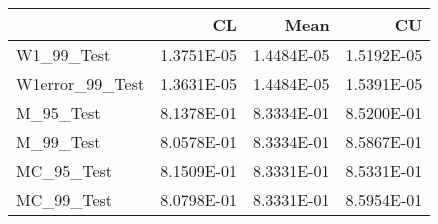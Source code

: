 \begin{tabular}{lrrr}
\toprule
{} &         CL &       Mean &         CU \\
\midrule
W1\_99\_Test      & 1.3751E-05 & 1.4484E-05 & 1.5192E-05 \\
W1error\_99\_Test & 1.3631E-05 & 1.4484E-05 & 1.5391E-05 \\
M\_95\_Test       & 8.1378E-01 & 8.3334E-01 & 8.5200E-01 \\
M\_99\_Test       & 8.0578E-01 & 8.3334E-01 & 8.5867E-01 \\
MC\_95\_Test      & 8.1509E-01 & 8.3331E-01 & 8.5331E-01 \\
MC\_99\_Test      & 8.0798E-01 & 8.3331E-01 & 8.5954E-01 \\
\bottomrule
\end{tabular}
